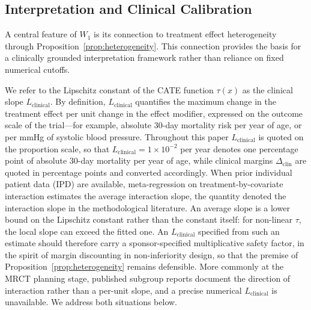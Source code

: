 \documentclass[AMA,Times1COL]{WileyNJDv5}
\begin{document}
\subsection{Interpretation and Clinical Calibration}\label{sec:inference}

A central feature of $W_1$ is its connection to treatment effect heterogeneity through Proposition~\ref{prop:heterogeneity}. This connection provides the basis for a clinically grounded interpretation framework rather than reliance on fixed numerical cutoffs.

We refer to the Lipschitz constant of the CATE function $\tau(x)$ as the clinical slope $L_{\text{clinical}}$. By definition, $L_{\text{clinical}}$ quantifies the maximum change in the treatment effect per unit change in the effect modifier, expressed on the outcome scale of the trial---for example, absolute 30-day mortality risk per year of age, or per mmHg of systolic blood pressure. Throughout this paper $L_{\text{clinical}}$ is quoted on the proportion scale, so that $L_{\text{clinical}} = 1 \times 10^{-2}$ per year denotes one percentage point of absolute 30-day mortality per year of age, while clinical margins $\Delta_{\text{clin}}$ are quoted in percentage points and converted accordingly. When prior individual patient data (IPD) are available, meta-regression on treatment-by-covariate interaction estimates the average interaction slope,\cite{riley2010,fisher2017} the quantity denoted the interaction slope in the methodological literature.\cite{vanderweele2014,vanderweele2019} An average slope is a lower bound on the Lipschitz constant rather than the constant itself: for non-linear $\tau$, the local slope can exceed the fitted one. An $L_{\text{clinical}}$ specified from such an estimate should therefore carry a sponsor-specified multiplicative safety factor, in the spirit of margin discounting in non-inferiority design, so that the premise of Proposition~\ref{prop:heterogeneity} remains defensible. More commonly at the MRCT planning stage, published subgroup reports document the direction of interaction rather than a per-unit slope, and a precise numerical $L_{\text{clinical}}$ is unavailable. We address both situations below.
\end{document}
